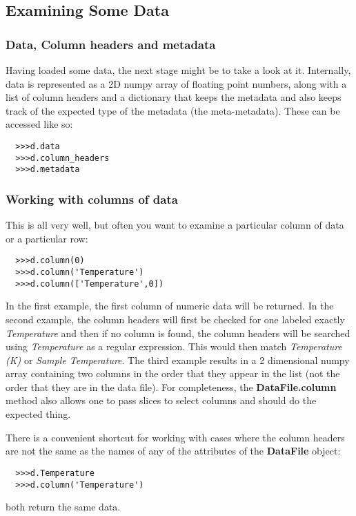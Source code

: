 \documentclass[a4paper,11pt]{scrartcl}
\begin{document}

\subsection{Examining Some Data}
\subsubsection{Data, Column headers and metadata}
Having loaded some data, the next stage might be to take a look at it.
Internally, data is represented as a 2D numpy array of floating point numbers,
along with a list of column headers and a dictionary that keeps the metadata and
also keeps track of the expected type of the metadata (\ie the meta-metadata).
These can be accessed like so:
\begin{verbatim}
  >>>d.data
  >>>d.column_headers
  >>>d.metadata
\end{verbatim}

\subsubsection{Working with columns of data}

This is all very well, but often you want to examine a particular column of data
or a particular row:
\begin{verbatim}
  >>>d.column(0)
  >>>d.column('Temperature')
  >>>d.column(['Temperature',0])
\end{verbatim}
In the first example, the first column of numeric data will be returned. In the
second example, the column headers will first be checked for one labeled exactly
\textit{Temperature} and then if no column is found, the column headers will be
searched using \textit{Temperature} as a regular expression. This would then
match \textit{Temperature (K)} or \textit{Sample Temperature}.  The third
example results in a 2 dimensional numpy array containing two columns in the
order that they appear in the list (\ie not the order that they are in the data
file). For completeness, the \textbf{DataFile.column} method also allows one to
pass slices to select columns and should do the expected thing.

There is a convenient shortcut for working with cases where the column headers are not the same
as the names of any of the attributes of the \textbf{DataFile} object:
\begin{verbatim}
  >>>d.Temperature
  >>>d.column('Temperature')
\end{verbatim}
both return the same data.
\end{document}
